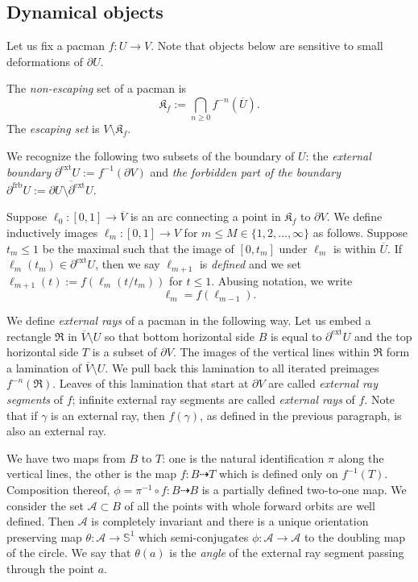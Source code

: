 \documentclass[]{amsart}
\newcommand\Kfilled{{\mathfrak K}}
\newcommand{\Rect}{{\mathfrak R }}
\newcommand\ext{{\operatorname{ext}}}
\newcommand\frb{{\operatorname{frb}}}
\theoremstyle{remark}
\numberwithin{equation}{section}
\theoremstyle{definition}
\begin{document}
\subsection{Dynamical objects}
\label{ss:DynObj}
Let us fix a pacman $f: U \to V$. Note that  objects below are sensitive to   small deformations of $\partial U$.

The \emph{non-escaping} set of a pacman  is  \[\Kfilled_{f}:=\bigcap_{n\ge 0} f^{-n}(\overline U).\] The \emph{escaping set} is $V\setminus \Kfilled_f$. 

We recognize the following two subsets of the boundary of $U$:  the \emph{external boundary} $\partial^{\ext} U := f^{-1}(\partial V)$ and \emph{the forbidden part of the boundary} $\partial^{\frb} U:= \overline {\partial U\setminus \partial^{\ext} U}$.

Suppose $\ell_0:[0,1]\to \overline V$ is an arc connecting a point in $\Kfilled_f$ to $\partial V$. We define inductively images $\ell_m:[0,1]\to V$ for $m\le M\in \{1,2,\dots, \infty\}$ as follows. Suppose $t_m\le 1$ be the maximal such that the image of $[0,t_m]$ under $\ell_m$ is within $\overline U$. If $\ell_m(t_m)\in \partial^{\ext} U$, then we say $\ell_{m+1}$ is \emph{defined} and we set $\ell_{m+1}(t):=f(\ell_m(t/t_m))$ for $t\le 1$.  Abusing notation, we write \[\ell_m= f(\ell_{m-1}).\]





We define \emph{external rays} of a pacman in the following way. Let us embed a rectangle $\Rect$ in $\overline{V} \setminus U$ so that bottom horizontal side $B$ is equal to $\partial^{\ext} U $ and the top horizontal side $T$ is a subset of $\partial V$. The images of the vertical lines within $\Rect$ form a lamination of $\overline{V} \setminus U$. We pull back this lamination to all iterated preimages $f^{-n}(\Rect)$. Leaves of this lamination that start at $\partial V$ are called \emph{external ray segments} of  $f$; infinite external ray segments are called \emph{external rays} of $f$. Note that if $\gamma$ is an external ray, then $f(\gamma)$, as defined in the previous paragraph, is also an external ray.

We have two maps from $B$ to $T$: one is the natural identification $\pi$ along the vertical lines, the other is the map $f\colon B \dashrightarrow T$ which is defined only on $f^{-1}(T)$. Composition thereof, $\phi = \pi^{-1} \circ f \colon B \dashrightarrow B$ is a partially defined two-to-one map. We consider the set $\mathcal{A}\subset B$ of all the points with whole forward orbits are well defined. Then $\mathcal{A}$ is completely invariant and there is a unique orientation preserving map $\theta \colon \mathcal{A} \to \mathbb{S}^1$   which semi-conjugates  $\phi \colon \mathcal{A} \to \mathcal{A}$ to the doubling map of the circle.
We say that $\theta(a)$ is the \emph{angle} of the  external ray segment passing through the point $a$. 
\end{document}
